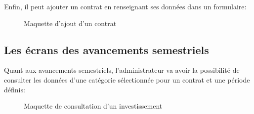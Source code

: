 \documentclass[a4paper]{report}
\begin{document}
\begin{doublespace}
	Enfin, il peut ajouter un contrat en renseignant ses données dans un formulaire:
	\begin{figure}[H]
		\begin{center}
			\caption{Maquette d'ajout d'un contrat}
		\end{center}
	\end{figure}

	\subsection{Les écrans des avancements semestriels}

	Quant aux avancements semestriels, l'administrateur va avoir la possibilité
	de consulter les données d'une catégorie sélectionnée pour un contrat et une période définis:
	\begin{figure}[H]
		\begin{center}
			\caption{Maquette de consultation d'un investissement}
		\end{center}
	\end{figure}


\end{doublespace}
\end{document}
